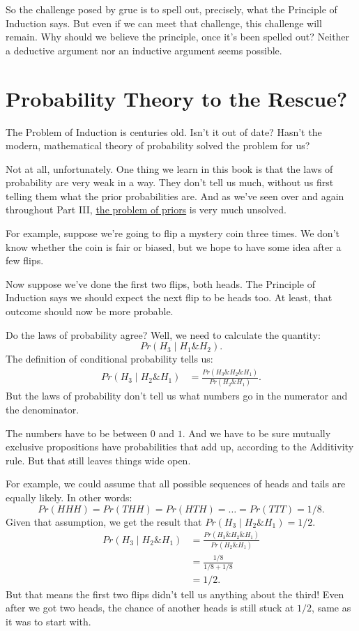 \documentclass[justified]{tufte-book}
\newcommand{\given}{\mid}
\renewcommand{\wedge}{\mathbin{\&}}
\newcommand{\p}{Pr}
\begin{document}
So the challenge posed by grue is to spell out, precisely, what the Principle of Induction says. But even if we can meet that challenge, this challenge will remain. Why should we believe the principle, once it's been spelled out? Neither a deductive argument nor an inductive argument seems possible.

\hypertarget{probability-theory-to-the-rescue}{%
\section*{Probability Theory to the Rescue?}\label{probability-theory-to-the-rescue}}

The Problem of Induction is centuries old. Isn't it out of date? Hasn't the modern, mathematical theory of probability solved the problem for us?

Not at all, unfortunately. One thing we learn in this book is that the laws of probability are very weak in a way. They don't tell us much, without us first telling them what the prior probabilities are. And as we've seen over and again throughout Part III, \protect\hyperlink{priors}{the problem of priors} is very much unsolved.

For example, suppose we're going to flip a mystery coin three times. We don't know whether the coin is fair or biased, but we hope to have some idea after a few flips.

Now suppose we've done the first two flips, both heads. The Principle of Induction says we should expect the next flip to be heads too. At least, that outcome should now be more probable.

Do the laws of probability agree? Well, we need to calculate the quantity:
\[ \p(H_3 \given H_1 \wedge H_2).\]
The definition of conditional probability tells us:
\[
  \begin{aligned}
    \p(H_3 \given H_2 \wedge H_1)
      &= \frac{\p(H_3 \wedge H_2 \wedge H_1)}{\p(H_2 \wedge H_1)}.
  \end{aligned}
\]
But the laws of probability don't tell us what numbers go in the numerator and the denominator.

The numbers have to be between \(0\) and \(1\). And we have to be sure mutually exclusive propositions have probabilities that add up, according to the Additivity rule. But that still leaves things wide open.

For example, we could assume that all possible sequences of heads and tails are equally likely. In other words:
\[ \p(HHH) = \p(THH) = \p(HTH) = \ldots = \p(TTT) = 1/8. \]
Given that assumption, we get the result that \(\p(H_3 \given H_2 \wedge H_1) = 1/2\).
\[
  \begin{aligned}
    \p(H_3 \given H_2 \wedge H_1)
      &= \frac{\p(H_3 \wedge H_2 \wedge H_1)}{\p(H_2 \wedge H_1)}\\
      &= \frac{1/8}{1/8 + 1/8}\\
      &= 1/2.
  \end{aligned}
\]
But that means the first two flips didn't tell us anything about the third! Even after we got two heads, the chance of another heads is still stuck at \(1/2\), same as it was to start with.
\end{document}
